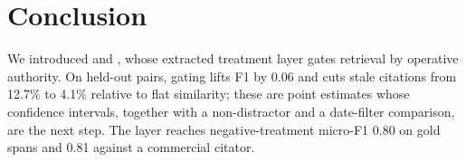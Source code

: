 \section{Conclusion}
\label{sec:conclusion}

We introduced \plre{} and \sysname{}, whose extracted treatment layer gates retrieval by operative authority.
On held-out pairs, gating lifts \plre{} F1 by 0.06 and cuts stale citations from 12.7\% to 4.1\% relative to flat similarity; these are point estimates whose confidence intervals, together with a non-distractor and a date-filter comparison, are the next step.
The layer reaches negative-treatment micro-F1 0.80 on gold spans and 0.81 against a commercial citator.
